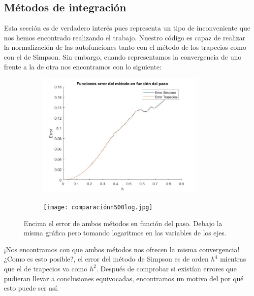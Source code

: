 \documentclass[12pt]{article}
\begin{document}
    \subsection{Métodos de integración}

    Esta sección es de verdadero interés pues representa un tipo de inconveniente que nos hemos encontrado realizando el trabajo. Nuestro código es capaz de realizar la normalización de las autofunciones tanto con el método de los trapecios como con el de Simpson. Sin embargo, cuando representamos la convergencia de uno frente a la de otra nos encontramos con lo siguiente:

        \begin{figure}[H]
    \centering
    \begin{subfigure}{1\textwidth}
            \includegraphics[width=0.9\textwidth]{comparacionn500.jpg}
    \end{subfigure}
    \hfill
    \begin{subfigure}{1\textwidth}
            \texttt{[image: comparaciónn500log.jpg]}
    \end{subfigure}
    \caption{Encima el error de ambos métodos en función del paso. Debajo la misma gráfica pero tomando logaritmos en las variables de los ejes.}
    \end{figure}

¡Nos encontramos con que ambos métodos nos ofrecen la misma convergencia! ¿Como es esto posible?, el error del método de Simpson es de orden $h^4$ mientras que el de trapecios va como $h^2$. Después de comprobar si existían errores que pudieran llevar a conclusiones equivocadas, encontramos un motivo del por qué esto puede ser así.\\
\end{document}
